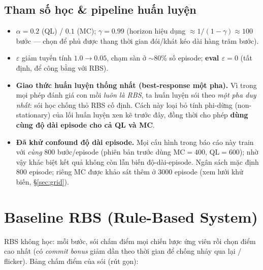 \documentclass[11pt,a4paper]{article}
\begin{document}
\subsection{Tham số học \& pipeline huấn luyện}\label{sec:train}

\begin{itemize}[leftmargin=1.4em,itemsep=1pt]
  \item $\alpha=0.2$ (QL) / $0.1$ (MC);\; $\gamma=0.99$ (horizon hiệu dụng $\approx 1/(1-\gamma)
        \approx 100$ bước --- chọn để phủ được thang thời gian đói/khát kéo dài hàng trăm bước).
  \item $\varepsilon$ giảm tuyến tính $1.0\!\to\!0.05$, chạm sàn ở $\sim 80\%$ số episode;
        \textbf{eval $\varepsilon=0$} (tất định, để công bằng với RBS).
  \item \textbf{Giao thức huấn luyện thống nhất (best-response một pha).} Vì trong mọi phép đánh
        giá con mồi \emph{luôn là RBS}, ta huấn luyện sói theo \emph{một pha duy nhất}: sói học
        chống thỏ RBS cố định. Cách này loại bỏ tính phi-dừng (non-stationary) của lối huấn luyện
        xen kẽ trước đây, đồng thời cho phép \textbf{dùng cùng độ dài episode cho cả QL và MC}.
  \item \textbf{Đã khử confound độ dài episode.} Mọi cấu hình trong báo cáo này train với
        \emph{cùng} $800$ bước/episode (phiên bản trước dùng MC$=400$, QL$=600$); nhờ vậy khác biệt
        kết quả không còn lẫn biến độ-dài-episode. Ngân sách mặc định $800$ episode; riêng MC được
        khảo sát thêm ở $3000$ episode (xem lưới khử biến, \S\ref{sec:grid}).
\end{itemize}

\section{Baseline RBS (Rule-Based System)}

RBS không học: mỗi bước, sói chấm điểm mọi chiến lược ứng viên rồi chọn điểm cao nhất (có
\emph{commit bonus} giảm dần theo thời gian để chống nhảy qua lại / flicker). Bảng chấm điểm của
sói (rút gọn):
\end{document}
